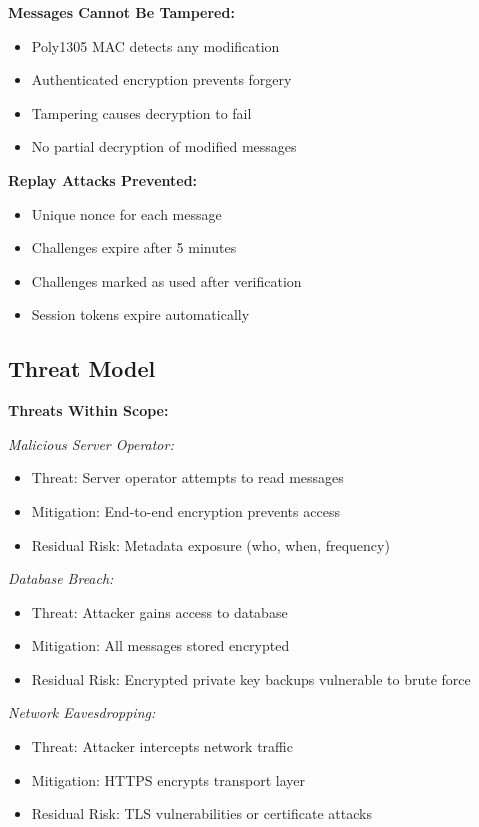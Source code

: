 \textbf{Messages Cannot Be Tampered:}
\begin{itemize}
    \item Poly1305 MAC detects any modification
    \item Authenticated encryption prevents forgery
    \item Tampering causes decryption to fail
    \item No partial decryption of modified messages
\end{itemize}

\textbf{Replay Attacks Prevented:}
\begin{itemize}
    \item Unique nonce for each message
    \item Challenges expire after 5 minutes
    \item Challenges marked as used after verification
    \item Session tokens expire automatically
\end{itemize}

\subsection{Threat Model}

\textbf{Threats Within Scope:}

\textit{Malicious Server Operator:}
\begin{itemize}
    \item Threat: Server operator attempts to read messages
    \item Mitigation: End-to-end encryption prevents access
    \item Residual Risk: Metadata exposure (who, when, frequency)
\end{itemize}

\textit{Database Breach:}
\begin{itemize}
    \item Threat: Attacker gains access to database
    \item Mitigation: All messages stored encrypted
    \item Residual Risk: Encrypted private key backups vulnerable to brute force
\end{itemize}

\textit{Network Eavesdropping:}
\begin{itemize}
    \item Threat: Attacker intercepts network traffic
    \item Mitigation: HTTPS encrypts transport layer
    \item Residual Risk: TLS vulnerabilities or certificate attacks
\end{itemize}

